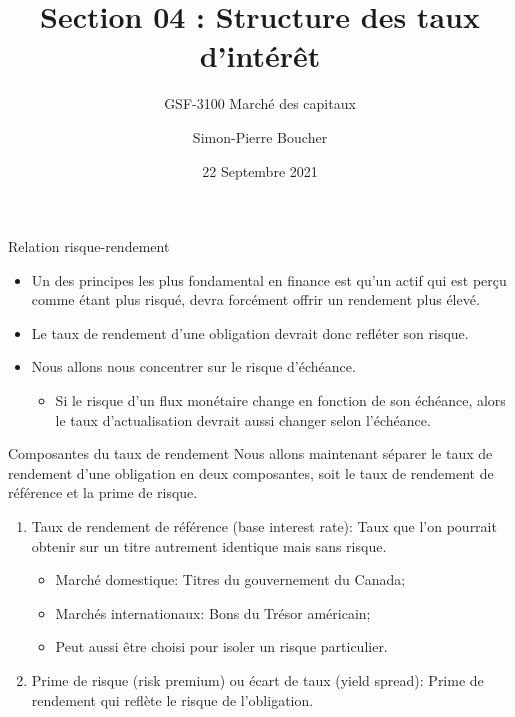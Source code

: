 \documentclass{beamer}
\title[S04 Taux d'intérêt]{Section 04 : Structure des taux d’intérêt}
\subtitle{GSF-3100 Marché des capitaux}
\author[SP. Boucher]{Simon-Pierre Boucher\inst{1}}
\institute[Université Laval]
{
  \inst{1}%
  Département de finance, assurance et immobilier\\
  Faculté des sciences de l'administration\\
  Université Laval}
\date[Automne 2021]{22 Septembre 2021}
\begin{document}
\begin{frame}
\titlepage
\end{frame}

\begin{frame}{Relation risque-rendement}
\begin{itemize}
\item Un des principes les plus fondamental en finance est qu'un actif qui est perçu comme étant plus risqué,  devra forcément offrir un rendement plus élevé. 
\item Le taux de rendement d’une obligation devrait donc refléter son risque. 
\item Nous allons nous concentrer sur le risque d'échéance.
\begin{itemize}
\item Si le risque d’un flux monétaire change en fonction de son échéance,  alors le taux d’actualisation devrait aussi changer selon l’échéance.
\end{itemize}
\end{itemize}
\end{frame}
\begin{frame}{Composantes du taux de rendement}
Nous allons maintenant séparer le taux de rendement d'une obligation en deux composantes,  soit le taux de rendement de référence et la prime de risque.

\begin{enumerate}
\item Taux de rendement de référence (base interest rate): Taux que l’on pourrait obtenir sur un titre autrement identique mais sans risque.
\begin{itemize}
\item Marché domestique: Titres du gouvernement du Canada;
\item Marchés internationaux: Bons du Trésor américain;
\item Peut aussi être choisi pour isoler un risque particulier.
\end{itemize}
\item Prime de risque (risk premium) ou écart de taux (yield spread): Prime de rendement qui reflète le risque de l’obligation.
\end{enumerate}
\end{frame}
\end{document}
